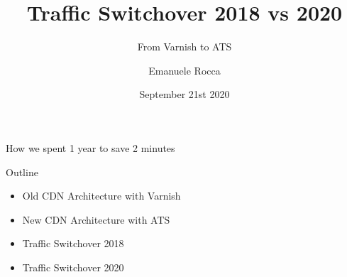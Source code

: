 \documentclass[14pt]{beamer}
\title{Traffic Switchover 2018 vs 2020}
\subtitle{From Varnish to ATS}
\author{Emanuele Rocca}
\institute{Wikimedia Foundation}
\date{September 21st 2020}
\begin{document}
\mktitle
\setcounter{framenumber}{0}

\lstset{basicstyle=\footnotesize\ttfamily,breaklines=true}
\lstset{framextopmargin=50pt,frame=bottomline}


\begin{frame}{}
\begin{center}
\Large{How we spent 1 year to save 2 minutes}
\end{center}
\end{frame}

\begin{frame}{Outline}
  \begin{itemize}
  \item Old CDN Architecture with Varnish
  \item New CDN Architecture with ATS
  \item Traffic Switchover 2018
  \item Traffic Switchover 2020
  \end{itemize}
\end{frame}

\end{document}
